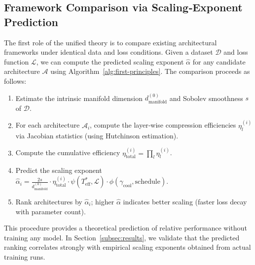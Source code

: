 \documentclass[11pt, a4paper]{article}
\theoremstyle{definition}
\begin{document}
\subsection{Framework Comparison via Scaling‑Exponent Prediction}
\label{subsec:framework-comparison}
The first role of the unified theory is to compare existing architectural frameworks under identical data and loss conditions. Given a dataset $\mathcal{D}$ and loss function $\mathcal{L}$, we can compute the predicted scaling exponent $\hat{\alpha}$ for any candidate architecture $\mathcal{A}$ using Algorithm~\ref{alg:first-principles}. The comparison proceeds as follows:
\begin{enumerate}
    \item Estimate the intrinsic manifold dimension $d_{\text{manifold}}^{(0)}$ and Sobolev smoothness $s$ of $\mathcal{D}$.
    \item For each architecture $\mathcal{A}_i$, compute the layer‑wise compression efficiencies $\eta_l^{(i)}$ via Jacobian statistics (using Hutchinson estimation).
    \item Compute the cumulative efficiency $\eta_{\text{total}}^{(i)} = \prod_l \eta_l^{(i)}$.
    \item Predict the scaling exponent $\hat{\alpha}_i = \frac{2s}{d_{\text{manifold}}^{(0)}} \cdot \eta_{\text{total}}^{(i)} \cdot \psi(T_{\text{eff}}^*, \mathcal{L}) \cdot \phi(\gamma_{\text{cool}}, \text{schedule})$.
    \item Rank architectures by $\hat{\alpha}_i$; higher $\hat{\alpha}$ indicates better scaling (faster loss decay with parameter count).
\end{enumerate}
This procedure provides a theoretical prediction of relative performance without training any model. In Section~\ref{subsec:results}, we validate that the predicted ranking correlates strongly with empirical scaling exponents obtained from actual training runs.
\end{document}

